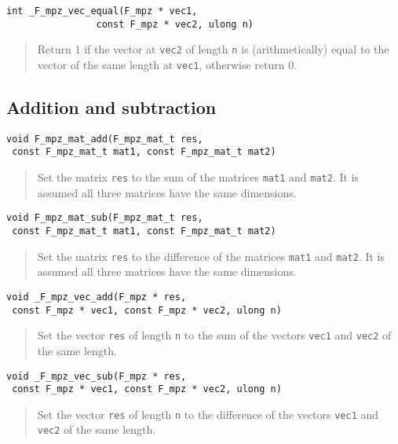 \documentclass[a4paper,10pt]{article}
\newcommand{\code}{\lstinline}
\begin{document}
\begin{lstlisting}
int _F_mpz_vec_equal(F_mpz * vec1, 
                const F_mpz * vec2, ulong n)
\end{lstlisting}
\begin{quote}
Return 1 if the vector at \code{vec2} of length \code{n} is (arithmetically) equal to the vector of the 
same length at \code{vec1}, otherwise return 0.
\end{quote}

\subsection{Addition and subtraction}

\begin{lstlisting}
void F_mpz_mat_add(F_mpz_mat_t res, 
 const F_mpz_mat_t mat1, const F_mpz_mat_t mat2)
\end{lstlisting}
\begin{quote}
Set the matrix \code{res} to the sum of the matrices \code{mat1} and \code{mat2}. It is assumed all three
matrices have the same dimensions.
\end{quote}

\begin{lstlisting}
void F_mpz_mat_sub(F_mpz_mat_t res, 
 const F_mpz_mat_t mat1, const F_mpz_mat_t mat2)
\end{lstlisting}
\begin{quote}
Set the matrix \code{res} to the difference of the matrices \code{mat1} and \code{mat2}. It is assumed all 
three matrices have the same dimensions.
\end{quote}

\begin{lstlisting}
void _F_mpz_vec_add(F_mpz * res, 
 const F_mpz * vec1, const F_mpz * vec2, ulong n)
\end{lstlisting}
\begin{quote}
Set the vector \code{res} of length \code{n} to the sum of the vectors \code{vec1} and \code{vec2} of the
same length.
\end{quote}

\begin{lstlisting}
void _F_mpz_vec_sub(F_mpz * res, 
 const F_mpz * vec1, const F_mpz * vec2, ulong n)
\end{lstlisting}
\begin{quote}
Set the vector \code{res} of length \code{n} to the difference of the vectors \code{vec1} and \code{vec2} 
of the same length.
\end{quote}
\end{document}
